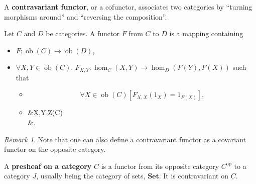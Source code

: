 \documentclass[12pt, letterpaper]{article}
\newcommand{\ob}{\operatorname{ob}}
\newcommand{\opp}[1]{{#1}^{\mathrm{op}}}
\newenvironment{eqlong}{\equation\aligned}{\endaligned\endequation}
\theoremstyle{definition}
\theoremstyle{remark}
\newtheorem*{rem*}{Remark}
\theoremstyle{definition}
\theoremstyle{plain}
\numberwithin{equation}{section}
\begin{document}
	
	\begin{def*}
		A \textbf{contravariant functor}, or a cofunctor, associates two categories
		by ``turning morphisms around'' and ``reversing the composition''.
		
		Let $C$ and $D$ be categories.
		A functor $F$ from $C$ to $D$ is a mapping containing
		\begin{itemize}
			\item $F\colon \ob(C) \to \ob(D)$,
			\item $\forall X , Y\in \ob(C)$, $F_{X,Y}\colon \hom_C(X, Y) \to \hom_D(F(Y), F(X))$
			such that
			\begin{itemize}
				\item 
				\begin{equation}
					\forall X \in \ob(C) [F_{X,X}(1_X)=1_{F(X)}],
				\end{equation}
				\item
				\begin{eqlong}
					&\forall X,Y,Z\in \ob(C)\\
					&\Big[\forall f \in \hom_C(X,Y)	\forall g \in \hom_C(Y,Z)\\
					&\big(F_{X,Z}(g\circ_C f)=F_{X,Y}(f)\circ_D F_{Y,Z}(g)\big)\Big].\\
				\end{eqlong}
			\end{itemize}
		\end{itemize}
	\end{def*}

	\begin{rem*}
		Note that one can also define a contravariant functor as a covariant functor on the opposite category.
	\end{rem*}


	\begin{def*}
		A \textbf{presheaf on a category} $C$ is a functor
		from its opposite category $\opp{C}$ to a category $J$,
		usually being the category of sets, $\mathbf{Set}$.
		It is contravariant on  $C$.
	\end{def*}
\end{document}
